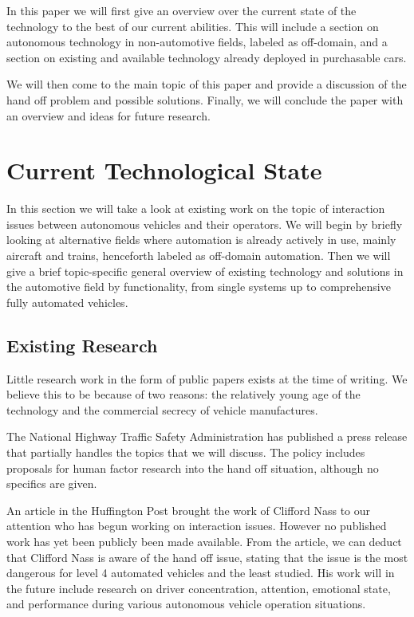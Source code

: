 \documentclass{acm_proc_article-sp}
\begin{document}
In this paper we will first give an overview over the current state of the technology to the best of our current abilities.
This will include a section on autonomous technology in non-automotive fields, labeled as off-domain, and a section on existing and available technology already deployed in purchasable cars.

We will then come to the main topic of this paper and provide a discussion of the hand off problem and possible solutions.
Finally, we will conclude the paper with an overview and ideas for future research.

\section{Current Technological State}

In this section we will take a look at existing work on the topic of interaction issues between autonomous vehicles and their operators.
We will begin by briefly looking at alternative fields where automation is already actively in use, mainly aircraft and trains, henceforth labeled as off-domain automation.
Then we will give a brief topic-specific general overview of existing technology and solutions in the automotive field by functionality, from single systems up to comprehensive fully automated vehicles.

\subsection{Existing Research}

Little research work in the form of public papers exists at the time of writing.
We believe this to be because of two reasons: the relatively young age of the technology and the commercial secrecy of vehicle manufactures.

The National Highway Traffic Safety Administration has published a press release \cite{nhtsa:av_policy} that partially handles the topics that we will discuss.
The policy includes proposals for human factor research into the hand off situation, although no specifics are given.

An article in the Huffington Post \cite{www:huffington_post} brought the work of Clifford Nass to our attention who has begun working on interaction issues.
However no published work has yet been publicly been made available.
From the article, we can deduct that Clifford Nass is aware of the hand off issue, stating that the issue is the most dangerous for level 4 automated vehicles and the least studied.
His work will in the future include research on driver concentration, attention, emotional state, and performance during various autonomous vehicle operation situations.
\end{document}
